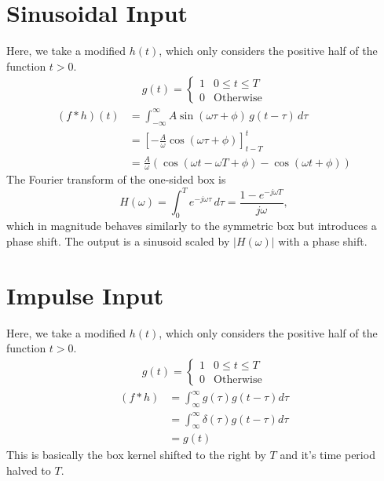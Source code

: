 \documentclass[12pt,a4paper]{report}
\newcommand{\brak}[1]{\ensuremath{\left(#1\right)}}
\providecommand{\sbrak}[1]{\ensuremath{{}\left[#1\right]}}
\providecommand{\brak}[1]{\ensuremath{\left(#1\right)}}
\begin{document}
\section{Sinusoidal Input}
Here, we take a modified $h\brak{t}$, which only considers the positive half of the function $t>0$.
\begin{align*}
    g\brak{t} = \begin{cases}
        1 & 0 \le t \le T\\
        0 & \text{Otherwise}
    \end{cases}
\end{align*}
\begin{align*}
(f \ast h)\brak{t} &= \int_{-\infty}^\infty A\sin\brak{\omega \tau + \phi} \, g\brak{t - \tau} \, d\tau \\
    &= \sbrak{-\frac{A}{\omega} \cos\brak{\omega \tau + \phi}}_{t-T}^t \\
    &= \frac{A}{\omega} \brak{\cos\brak{\omega t - \omega T + \phi} - \cos\brak{\omega t + \phi}}
\end{align*}
The Fourier transform of the one-sided box is
\[
H(\omega) = \int_{0}^{T} e^{-j\omega\tau}\, d\tau = \frac{1 - e^{-j\omega T}}{j\omega},
\]
which in magnitude behaves similarly to the symmetric box but introduces a phase shift. The output is a sinusoid scaled by $|H(\omega)|$ with a phase shift.
\section{Impulse Input}
Here, we take a modified $h\brak{t}$, which only considers the positive half of the function $t>0$.
\begin{align*}
    g\brak{t} = \begin{cases}
        1 & 0 \le t \le T\\
        0 & \text{Otherwise}
    \end{cases}
\end{align*}
\begin{align*}
    \brak{f\ast h} &= \int_{\infty}^{\infty} g\brak{\tau} g\brak{t-\tau}d\tau\\
    &= \int_{\infty}^{\infty} \delta\brak{\tau} g\brak{t-\tau}d\tau\\ 
    &= g\brak{t}
\end{align*}
This is basically the box kernel shifted to the right by $T$ and it's time period halved to $T$.
\end{document}
